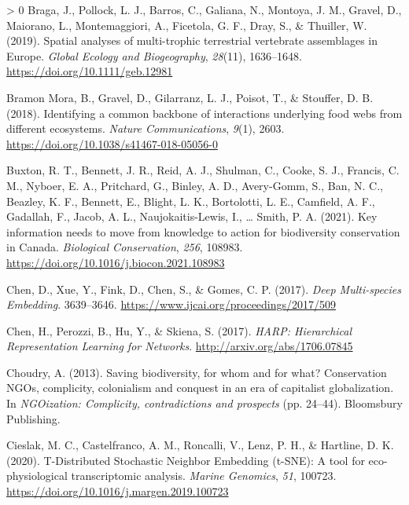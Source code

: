 \documentclass[10pt,oneside]{article}
\newlength{\cslhangindent}
\newenvironment{CSLReferences}[3] %
 {%
  \setlength{\parindent}{0pt}
  \ifodd #1 \everypar{\setlength{\hangindent}{\cslhangindent}}\ignorespaces\fi
  \ifnum #2 > 0
  \setlength{\parskip}{#2\baselineskip}
  \fi
 }%
 {}
\begin{document}
\begin{CSLReferences}{1}{0}
\leavevmode\hypertarget{ref-Braga2019SpaAna}{}%
Braga, J., Pollock, L. J., Barros, C., Galiana, N., Montoya, J. M.,
Gravel, D., Maiorano, L., Montemaggiori, A., Ficetola, G. F., Dray, S.,
\& Thuiller, W. (2019). Spatial analyses of multi-trophic terrestrial
vertebrate assemblages in Europe. \emph{Global Ecology and
Biogeography}, \emph{28}(11), 1636--1648.
\url{https://doi.org/10.1111/geb.12981}

\leavevmode\hypertarget{ref-BramonMora2018IdeCom}{}%
Bramon Mora, B., Gravel, D., Gilarranz, L. J., Poisot, T., \& Stouffer,
D. B. (2018). Identifying a common backbone of interactions underlying
food webs from different ecosystems. \emph{Nature Communications},
\emph{9}(1), 2603. \url{https://doi.org/10.1038/s41467-018-05056-0}

\leavevmode\hypertarget{ref-Buxton2021KeyInf}{}%
Buxton, R. T., Bennett, J. R., Reid, A. J., Shulman, C., Cooke, S. J.,
Francis, C. M., Nyboer, E. A., Pritchard, G., Binley, A. D., Avery-Gomm,
S., Ban, N. C., Beazley, K. F., Bennett, E., Blight, L. K., Bortolotti,
L. E., Camfield, A. F., Gadallah, F., Jacob, A. L., Naujokaitis-Lewis,
I., \ldots{} Smith, P. A. (2021). Key information needs to move from
knowledge to action for biodiversity conservation in Canada.
\emph{Biological Conservation}, \emph{256}, 108983.
\url{https://doi.org/10.1016/j.biocon.2021.108983}

\leavevmode\hypertarget{ref-Chen2017DeeMul}{}%
Chen, D., Xue, Y., Fink, D., Chen, S., \& Gomes, C. P. (2017).
\emph{Deep Multi-species Embedding}. 3639--3646.
\url{https://www.ijcai.org/proceedings/2017/509}

\leavevmode\hypertarget{ref-Chen2017HarHie}{}%
Chen, H., Perozzi, B., Hu, Y., \& Skiena, S. (2017). \emph{HARP:
Hierarchical Representation Learning for Networks}.
\url{http://arxiv.org/abs/1706.07845}

\leavevmode\hypertarget{ref-Choudry2013SavBio}{}%
Choudry, A. (2013). Saving biodiversity, for whom and for what?
Conservation NGOs, complicity, colonialism and conquest in an era of
capitalist globalization. In \emph{NGOization: Complicity,
contradictions and prospects} (pp. 24--44). Bloomsbury Publishing.

\leavevmode\hypertarget{ref-Cieslak2020TdiSto}{}%
Cieslak, M. C., Castelfranco, A. M., Roncalli, V., Lenz, P. H., \&
Hartline, D. K. (2020). T-Distributed Stochastic Neighbor Embedding
(t-SNE): A tool for eco-physiological transcriptomic analysis.
\emph{Marine Genomics}, \emph{51}, 100723.
\url{https://doi.org/10.1016/j.margen.2019.100723}


\end{CSLReferences}
\end{document}
